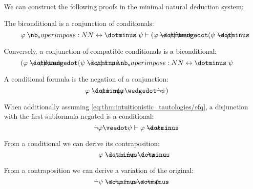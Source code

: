 \begin{proposition}\label{thm:propositional_derivations}
  We can construct the following proofs in the \hyperref[def:propositional_natural_deduction_systems]{minimal natural deduction system}:
  \begin{thmenum}
     The biconditional is a conjunction of conditionals:
    \begin{equation}\label{eq:thm:propositional_derivations/biconditional_as_conjunction}
      \varphi \syniff \psi \vdash (\varphi \synimplies \psi) \synwedge  (\psi \synimplies \varphi)
    \end{equation}

     Conversely, a conjunction of compatible conditionals is a biconditional:
    \begin{equation}\label{eq:thm:propositional_derivations/conjunction_of_conditionals}
      (\varphi \synimplies \psi) \synwedge (\psi \synimplies \varphi) \vdash \varphi \syniff \psi
    \end{equation}

     A conditional formula is the negation of a conjunction:
    \begin{equation}\label{eq:thm:propositional_derivations/conditional_as_conjunction}
      \varphi \synimplies \psi \vdash \neg(\varphi \synwedge \synneg \psi)
    \end{equation}

     When additionally assuming \eqref{eq:thm:intuitionistic_tautologies/efq}, a disjunction with the first subformula negated is a conditional:
    \begin{equation}\label{eq:thm:propositional_derivations/disjunction_as_conditional}
      \synneg \varphi \synvee \psi \vdash \varphi \synimplies \psi
    \end{equation}

     From a conditional we can derive its contraposition:
    \begin{equation}\label{eq:thm:propositional_derivations/contraposition}
      \varphi \synimplies \psi \vdash \synneg \psi \synimplies \synneg \varphi
    \end{equation}

     From a contraposition we can derive a variation of the original:
    \begin{equation}\label{eq:thm:propositional_derivations/contraposition_elim}
      \synneg \psi \synimplies \synneg \varphi \vdash \varphi \synimplies \synneg \synneg \psi
    \end{equation}
  \end{thmenum}
\end{proposition}
